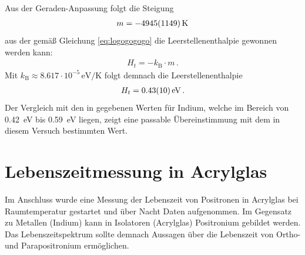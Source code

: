 \documentclass[11pt, a4paper]{article}
\numberwithin{equation}{section}
\begin{document}
Aus der Geraden-Anpassung folgt die Steigung
\begin{align*}
	m = \SI{-4945 +- 1149}{\kelvin}
\end{align*}
aus der gemäß Gleichung \eqref{eq:logogogogo} die Leerstellenenthalpie gewonnen werden kann:
\begin{align*}
	H_t = -k_\mathrm{B} \cdot m \, \text{.}
\end{align*}
Mit $k_\mathrm{B} \approx \num{8.617} \cdot 10^{-5} \, \si{\eV\per\kelvin}$ \cite{codata} folgt demnach die Leerstellenenthalpie
\begin{align*}
	H_t = \SI{0.43 +- 0.10}{\electronvolt} \, \text{.}
\end{align*}
Der Vergleich mit den in \cite{indium} gegebenen Werten für Indium, welche im Bereich von \SI{0.42}{\eV} bis \SI{0.59}{\eV} liegen, zeigt eine passable Übereinstimmung mit dem in diesem Versuch bestimmten Wert.








\section{Lebenszeitmessung in Acrylglas}
Im Anschluss wurde eine Messung der Lebenszeit von Positronen in Acrylglas bei Raumtemperatur gestartet und über Nacht Daten aufgenommen.
Im Gegensatz zu Metallen (Indium) kann in Isolatoren (Acrylglas) Positronium gebildet werden.
Das Lebenszeitspektrum sollte demnach Aussagen über die Lebenszeit von Ortho- und Parapositronium ermöglichen.
\end{document}
